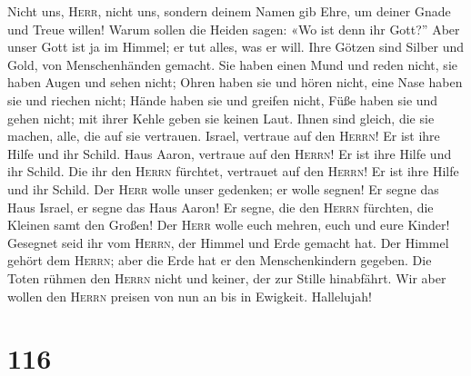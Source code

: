 Nicht uns, \textsc{Herr}, nicht uns, sondern deinem Namen
gib Ehre, um deiner Gnade und Treue willen!  Warum sollen
die Heiden sagen: «Wo ist denn ihr Gott?''  Aber unser
Gott ist ja im Himmel; er tut alles, was er will.  Ihre
Götzen sind Silber und Gold, von Menschenhänden gemacht. 
Sie haben einen Mund und reden nicht, sie haben Augen und sehen nicht;
 Ohren haben sie und hören nicht, eine Nase haben sie und
riechen nicht;  Hände haben sie und greifen nicht, Füße
haben sie und gehen nicht; mit ihrer Kehle geben sie keinen Laut.
 Ihnen sind gleich, die sie machen, alle, die auf sie
vertrauen.  Israel, vertraue auf den \textsc{Herrn}! Er
ist ihre Hilfe und ihr Schild.  Haus Aaron, vertraue auf
den \textsc{Herrn}! Er ist ihre Hilfe und ihr Schild. 
Die ihr den \textsc{Herrn} fürchtet, vertrauet auf den \textsc{Herrn}!
Er ist ihre Hilfe und ihr Schild.  Der \textsc{Herr}
wolle unser gedenken; er wolle segnen! Er segne das Haus Israel, er
segne das Haus Aaron!  Er segne, die den \textsc{Herrn}
fürchten, die Kleinen samt den Großen!  Der \textsc{Herr}
wolle euch mehren, euch und eure Kinder!  Gesegnet seid
ihr vom \textsc{Herrn}, der Himmel und Erde gemacht hat. 
Der Himmel gehört dem \textsc{Herrn}; aber die Erde hat er den
Menschenkindern gegeben.  Die Toten rühmen den
\textsc{Herrn} nicht und keiner, der zur Stille hinabfährt.
 Wir aber wollen den \textsc{Herrn} preisen von nun an
bis in Ewigkeit. Hallelujah!

\hypertarget{section-115}{%
\section{116}\label{section-115}}

